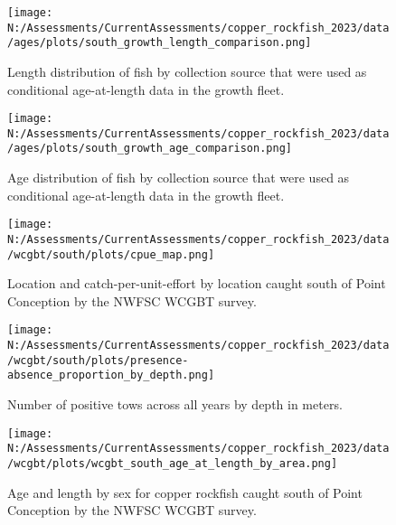 \documentclass[11pt,
  english,
  letterpaper,
]{article}
\begin{document}
\pagebreak

\begin{figure}
\centering
\texttt{[image: N:/Assessments/CurrentAssessments/copper\_rockfish\_2023/data/ages/plots/south\_growth\_length\_comparison.png]}
\caption{Length distribution of fish by collection source that were used as conditional age-at-length data in the growth fleet.\label{fig:growth-len-dist}}
\end{figure}

\pagebreak

\begin{figure}
\centering
\texttt{[image: N:/Assessments/CurrentAssessments/copper\_rockfish\_2023/data/ages/plots/south\_growth\_age\_comparison.png]}
\caption{Age distribution of fish by collection source that were used as conditional age-at-length data in the growth fleet.\label{fig:growth-age-dist}}
\end{figure}

\pagebreak

\begin{figure}
\centering
\texttt{[image: N:/Assessments/CurrentAssessments/copper\_rockfish\_2023/data/wcgbt/south/plots/cpue\_map.png]}
\caption{Location and catch-per-unit-effort by location caught south of Point Conception by the NWFSC WCGBT survey.\label{fig:wcgbt-cpue}}
\end{figure}

\pagebreak

\begin{figure}
\centering
\texttt{[image: N:/Assessments/CurrentAssessments/copper\_rockfish\_2023/data/wcgbt/south/plots/presence-absence\_proportion\_by\_depth.png]}
\caption{Number of positive tows across all years by depth in meters.\label{fig:wcgbt-depth}}
\end{figure}

\pagebreak

\begin{figure}
\centering
\texttt{[image: N:/Assessments/CurrentAssessments/copper\_rockfish\_2023/data/wcgbt/plots/wcgbt\_south\_age\_at\_length\_by\_area.png]}
\caption{Age and length by sex for copper rockfish caught south of Point Conception by the NWFSC WCGBT survey.\label{fig:wcgbt-len-age}}
\end{figure}

\pagebreak
\end{document}

